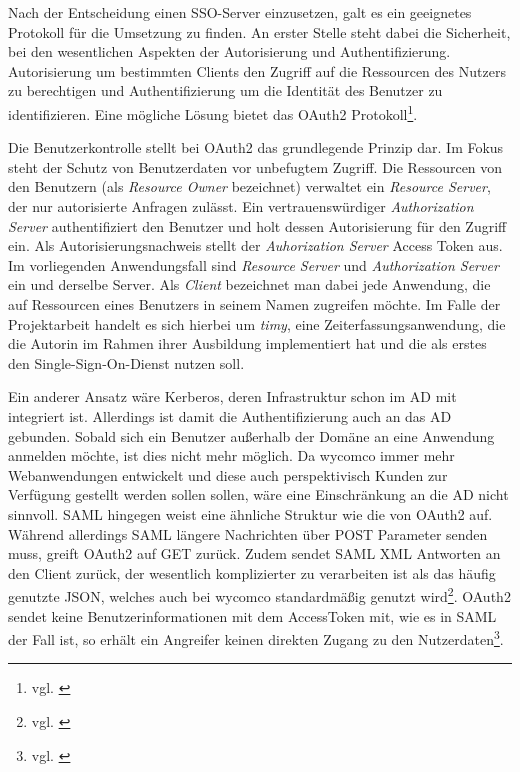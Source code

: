 Nach der Entscheidung einen \ac{SSO}-Server einzusetzen, galt es ein geeignetes Protokoll für die Umsetzung zu finden. An erster Stelle steht dabei die Sicherheit, bei den wesentlichen Aspekten der Autorisierung und Authentifizierung. Autorisierung um bestimmten Clients den Zugriff auf die Ressourcen des Nutzers zu berechtigen und Authentifizierung um die Identität des Benutzer zu identifizieren. Eine mögliche Lösung bietet das OAuth2 Protokoll\footnote{vgl. \cite{OAuth2}}.

Die Benutzerkontrolle stellt bei OAuth2 das grundlegende Prinzip dar. Im Fokus steht der Schutz von Benutzerdaten vor unbefugtem Zugriff. Die Ressourcen von den Benutzern (als \textit{Resource Owner} bezeichnet) verwaltet ein \textit{Resource Server}, der nur autorisierte Anfragen zulässt. Ein vertrauenswürdiger \textit{Authorization Server} authentifiziert den Benutzer und holt dessen Autorisierung für den Zugriff ein. Als Autorisierungsnachweis stellt der \textit{Auhorization Server} Access Token aus. Im vorliegenden Anwendungsfall sind \textit{Resource Server} und \textit{Authorization Server} ein und derselbe Server.
Als \textit{Client} bezeichnet man dabei jede Anwendung, die auf Ressourcen eines Benutzers in seinem Namen zugreifen möchte. Im Falle der Projektarbeit handelt es sich hierbei um \textit{timy}, eine Zeiterfassungsanwendung, die die Autorin im Rahmen ihrer Ausbildung implementiert hat und die als erstes den Single-Sign-On-Dienst nutzen soll. 

Ein anderer Ansatz wäre Kerberos, deren Infrastruktur schon im \ac{AD} mit integriert ist. Allerdings ist damit die Authentifizierung auch an das \ac{AD} gebunden. Sobald sich ein Benutzer außerhalb der Domäne an eine Anwendung anmelden möchte, ist dies nicht mehr möglich. Da wycomco immer mehr Webanwendungen entwickelt und diese auch perspektivisch Kunden zur Verfügung gestellt werden sollen sollen, wäre eine Einschränkung an die AD nicht sinnvoll. 
\acs{SAML} hingegen weist eine ähnliche Struktur wie die von OAuth2 auf. Während allerdings SAML längere Nachrichten über POST Parameter senden muss, greift OAuth2 auf GET zurück. Zudem sendet SAML \acs{XML} Antworten an den Client zurück, der wesentlich komplizierter zu verarbeiten ist als das häufig genutzte \acs{JSON}, welches auch bei wycomco standardmäßig genutzt wird\footnote{vgl. \cite{SSO-Vgl}}.
OAuth2 sendet keine Benutzerinformationen mit dem AccessToken mit, wie es in SAML der Fall ist, so erhält ein Angreifer keinen direkten Zugang zu den Nutzerdaten\footnote{vgl. \cite{book}}.

